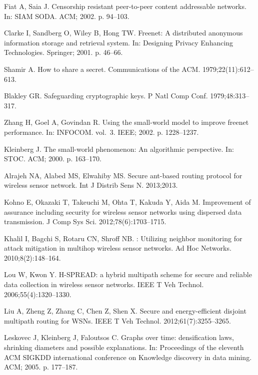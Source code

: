 \documentclass[10pt,letterpaper]{article}
\begin{document}
\begin{thebibliography}{10}
Fiat A, Saia J.
\newblock Censorship resistant peer-to-peer content addressable networks.
\newblock In: {SIAM} {SODA}. ACM; 2002. p. 94--103.

Clarke I, Sandberg O, Wiley B, Hong TW.
\newblock Freenet: {A} distributed anonymous information storage and retrieval
  system.
\newblock In: Designing {Privacy} {Enhancing} {Technologies}. Springer; 2001.
  p. 46--66.

Shamir A.
\newblock How to share a secret.
\newblock Communications of the ACM. 1979;22(11):612--613.

Blakley GR.
\newblock Safeguarding cryptographic keys.
\newblock P Natl Comp Conf. 1979;48:313--317.

Zhang H, Goel A, Govindan R.
\newblock Using the small-world model to improve freenet performance.
\newblock In: {INFOCOM}. vol.~3. IEEE; 2002. p. 1228--1237.

Kleinberg J.
\newblock The small-world phenomenon: {An} algorithmic perspective.
\newblock In: {STOC}. ACM; 2000. p. 163--170.

Alrajeh NA, Alabed MS, Elwahiby MS.
\newblock Secure ant-based routing protocol for wireless sensor network.
\newblock Int J Distrib Sens N. 2013;2013.

Kohno E, Okazaki T, Takeuchi M, Ohta T, Kakuda Y, Aida M.
\newblock Improvement of assurance including security for wireless sensor
  networks using dispersed data transmission.
\newblock J Comp Sys Sci. 2012;78(6):1703--1715.

Khalil I, Bagchi S, Rotaru CN, Shroff NB.
: {Utilizing} neighbor monitoring for attack mitigation in
  multihop wireless sensor networks.
\newblock Ad Hoc Networks. 2010;8(2):148--164.

Lou W, Kwon Y.
\newblock H-{SPREAD}: a hybrid multipath scheme for secure and reliable data
  collection in wireless sensor networks.
\newblock IEEE T Veh Technol. 2006;55(4):1320--1330.

Liu A, Zheng Z, Zhang C, Chen Z, Shen X.
\newblock Secure and energy-efficient disjoint multipath routing for {WSNs}.
\newblock IEEE T Veh Technol. 2012;61(7):3255--3265.

Leskovec J, Kleinberg J, Faloutsos C.
\newblock Graphs over time: densification laws, shrinking diameters and
  possible explanations.
\newblock In: Proceedings of the eleventh {ACM} {SIGKDD} international
  conference on {Knowledge} discovery in data mining. ACM; 2005. p. 177--187.


\end{thebibliography}
\end{document}
